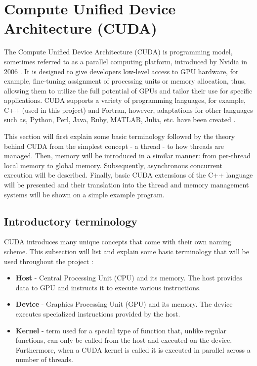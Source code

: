 \section{Compute Unified Device Architecture (CUDA) \TO}\label{Section:CUDA}
The Compute Unified Device Architecture (CUDA) is programming model, sometimes referred to as a parallel computing platform, introduced by Nvidia in 2006 \cite{Oh10September2012}. It is designed to give developers low-level access to GPU hardware, for example, fine-tuning assignment of processing units or memory allocation, thus, allowing them to utilize the full potential of GPUs and tailor their use for specific applications. CUDA supports a variety of programming languages, for example, C++ (used in this project) and Fortran, however, adaptations for other languages such as, Python, Perl, Java, Ruby, MATLAB, Julia, etc. have been created \cite{OsGyRFLMngy0j8Pv}.
\par This section will first explain some basic terminology followed by the theory behind CUDA from the simplest concept - a thread - to how threads are managed. Then, memory will be introduced in a similar manner: from per-thread local memory to global memory. Subsequently, asynchronous concurrent execution will be described. Finally, basic CUDA extensions of the C++ language will be presented and their translation into the thread and memory management systems will be shown on a simple example program.

\subsection{Introductory terminology \TO}\label{Subsection:CUDA-introductory-terminology}
CUDA introduces many unique concepts that come with their own naming scheme. This subsection will list and explain some basic terminology that will be used throughout the project \cite{Ruetsch2008}:
\begin{itemize}
	\item \textbf{Host} - Central Processing Unit (CPU) and its memory. The host provides data to GPU and instructs it to execute various instructions.
	\item \textbf{Device} - Graphics Processing Unit (GPU) and its memory. The device executes specialized instructions provided by the host.
	\item \textbf{Kernel} - term used for a special type of function that, unlike regular functions, can only be called from the host and executed on the device. Furthermore, when a CUDA kernel is called it is executed in parallel across a number of threads.	
\end{itemize}


